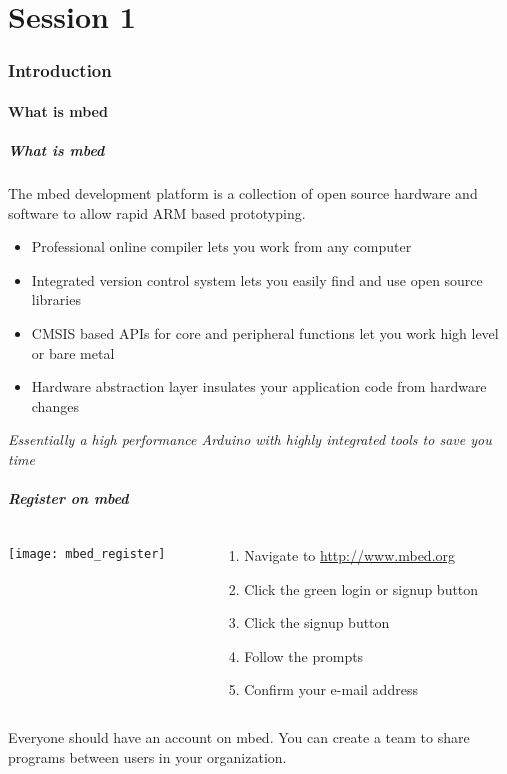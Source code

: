 \part{Session 1}

\section{Introduction}
\subsection{What is mbed}
\begin{frame}
	\frametitle{What is mbed}
	The mbed development platform is a collection of open source hardware and software to allow rapid ARM based prototyping.
	\begin{itemize}
		\item Professional online compiler lets you work from any computer
		\item Integrated version control system lets you easily find and use open source libraries
		\item CMSIS based APIs for core and peripheral functions let you work high level or bare metal
		\item Hardware abstraction layer insulates your application code from hardware changes
	\end{itemize}
	\textit{Essentially a high performance Arduino with highly integrated tools to save you time}
\end{frame}

\begin{frame}
	\frametitle{Register on mbed}
	\begin{columns}[c]
		\begin{column}{0.5\textwidth}
			\texttt{[image: mbed\_register]}
		\end{column}
		\begin{column}{0.5\textwidth}
			\begin{enumerate}
				\item Navigate to \url{http://www.mbed.org}
				\item Click the green login or signup button
				\item Click the signup button
				\item Follow the prompts
				\item Confirm your e-mail address
			\end{enumerate}
		\end{column}
	\end{columns}
	\vspace{1ex}
	Everyone should have an account on mbed.
	You can create a team to share programs between users in your organization.
\end{frame}

